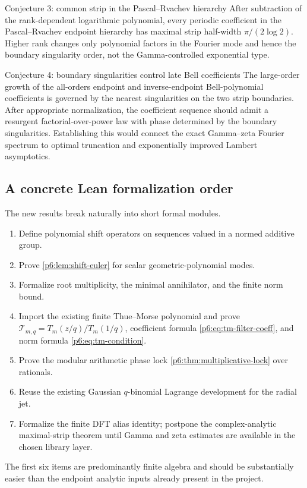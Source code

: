 \documentclass[11pt]{article}
\numberwithin{equation}{section}
\theoremstyle{definition}
\theoremstyle{remark}
\begin{document}
\begin{conjecturebox}{Conjecture 3: common strip in the Pascal--Rvachev hierarchy}
After subtraction of the rank-dependent logarithmic polynomial, every periodic coefficient
in the Pascal--Rvachev endpoint hierarchy has maximal strip half-width
$\pi/(2\log2)$.  Higher rank changes only polynomial factors in the Fourier mode and hence
the boundary singularity order, not the Gamma-controlled exponential type.
\end{conjecturebox}

\begin{conjecturebox}{Conjecture 4: boundary singularities control late Bell coefficients}
The large-order growth of the all-orders endpoint and inverse-endpoint Bell-polynomial
coefficients is governed by the nearest singularities on the two strip boundaries.  After
appropriate normalization, the coefficient sequence should admit a resurgent
factorial-over-power law with phase determined by the boundary singularities.  Establishing
this would connect the exact Gamma--zeta Fourier spectrum to optimal truncation and
exponentially improved Lambert asymptotics.
\end{conjecturebox}

\subsection{A concrete Lean formalization order}

The new results break naturally into short formal modules.
\begin{enumerate}
\item Define polynomial shift operators on sequences valued in a normed additive group.
\item Prove \cref{p6:lem:shift-euler} for scalar geometric-polynomial modes.
\item Formalize root multiplicity, the minimal annihilator, and the finite norm bound.
\item Import the existing finite Thue--Morse polynomial and prove
$\mathcal T_{m,q}=T_m(z/q)/T_m(1/q)$, coefficient formula
\eqref{p6:eq:tm-filter-coeff}, and norm formula \eqref{p6:eq:tm-condition}.
\item Prove the modular arithmetic phase lock \cref{p6:thm:multiplicative-lock} over rationals.
\item Reuse the existing Gaussian $q$-binomial Lagrange development for the radial jet.
\item Formalize the finite DFT alias identity; postpone the complex-analytic maximal-strip
      theorem until Gamma and zeta estimates are available in the chosen library layer.
\end{enumerate}
The first six items are predominantly finite algebra and should be substantially easier than
the endpoint analytic inputs already present in the project.
\end{document}
